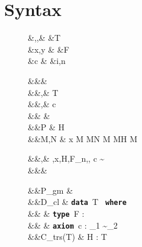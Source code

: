 \documentclass[screen,nonacm,manuscript,review]{acmart} %
\begin{document}
\section{Syntax}\label{sec:sfc-syntax}
\begin{figure}[ht]
 \centering
 \begin{syntax}
  &\TyVar,\beta,\Co &\qquad{} &T \\
  &x,y &\qquad{} &F\\
  &c &\qquad{} &i,n \in {}
 \end{syntax}
 \begin{syntax}
  &&\kappa \bnfeq& \star \bnfor \kappa \to \kappa \bnfor \shl{\sigma \sim \tau}\\
  &&\tau,\sigma \bnfeq& \TyVar \bnfor T \bnfor \tau \to \tau \bnfor \tau\App\tau \bnfor \Forall {\TyVar\co\kappa} \tau \bnfor {} \bnfor \shl{\Co}\\
  &&\nu,\Co \bnfeq& c \bnfor \Refl\tau \bnfor \Sym\Co \bnfor \Trans\nu\Co %
 \bnfor \Forall {\TyVar\co\kappa} \Co \bnfor \Co\At\tau %
 \bnfor \nu\App\Co \bnfor \Left \Co \bnfor \Right \Co\\  %
  && \phi \bnfeq& \tau \bnfor \Co\\
  &&P \bnfeq& H\App \many{\beta\co\kappa} \\
  &&M,N \bnfeq& x \bnfor {} M \bnfor M\App N \bnfor \TLam{\phi\co\kappa} M \bnfor M\App \tau \bnfor H \bnfor \Case M  \bnfor \shl{\Cast \Tm \Co}\\

 \end{syntax}
 \begin{syntax}
  &&\TEnv,\Delta \bnfeq& \empt \bnfor \TEnv,x\co\tau \bnfor \TEnv,H\co\tau \bnfor \TEnv,F_n\App\many\tau\co\kappa \bnfor \TEnv,\TyVar\co\kappa  \bnfor \TEnv, c \co \tau\sim\sigma\\
  &&\Subst \bnfeq& \empt \bnfor \Set{\many{\TyVar \mapsto \tau}}
 \end{syntax}

 \begin{syntax}
  &&P_{gm} \bnfeq&  \mathrel{;} \\
  &&D_{cl} \bnfeq& \textbf{\texttt{data }}\App T\co\many{\kappa} \to \star\App \textbf{\texttt{ where }}\App {} \\
 && \bnfor& \textbf{\texttt{type }}\App F : \many\kappa \to \kappa\\
 && \bnfor& \textbf{\texttt{axiom }}\App c\App \many{\TyVar\co\kappa} : \sigma_1 \sim \sigma_2\\
  &&C_{trs}(T) \bnfeq& H : \Forall {\many{\TyVar\co\kappa}} { \many\sigma \to T\many\TyVar}\\
 \end{syntax}


\end{figure}
\end{document}
